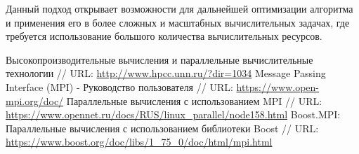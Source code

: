 \documentclass{report}
\begin{document}
Данный подход открывает возможности для дальнейшей оптимизации алгоритма и применения его в более сложных и масштабных вычислительных задачах, где требуется использование большого количества вычислительных ресурсов. 

\newpage
\begin{thebibliography}{1}
	   Высокопроизводительные вычисления и параллельные вычислительные технологии // URL: \url{http://www.hpcc.unn.ru/?dir=1034}
	  Message Passing Interface (MPI) - Руководство пользователя // URL: \url{https://www.open-mpi.org/doc/}
	 Параллельные вычисления с использованием MPI // URL: \url{https://www.opennet.ru/docs/RUS/linux_parallel/node158.html}
	 Boost.MPI: Параллельные вычисления с использованием библиотеки Boost // URL: \url{https://www.boost.org/doc/libs/1_75_0/doc/html/mpi.html}
\end{thebibliography}
\newpage
\end{document}
